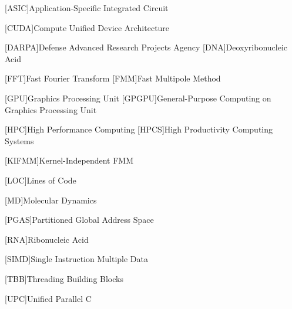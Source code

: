 [ASIC]{Application-Specific Integrated Circuit}

[CUDA]{Compute Unified Device Architecture}

[DARPA]{Defense Advanced Research Projects Agency}
[DNA]{Deoxyribonucleic Acid}

[FFT]{Fast Fourier Transform}
[FMM]{Fast Multipole Method}

[GPU]{Graphics Processing Unit}
[GPGPU]{General-Purpose Computing on Graphics Processing Unit}

[HPC]{High Performance Computing}
[HPCS]{High Productivity Computing Systems}

[KIFMM]{Kernel-Independent FMM}

[LOC]{Lines of Code}

[MD]{Molecular Dynamics}

[PGAS]{Partitioned Global Address Space}

[RNA]{Ribonucleic Acid}

[SIMD]{Single Instruction Multiple Data}

[TBB]{Threading Building Blocks}

[UPC]{Unified Parallel C}
